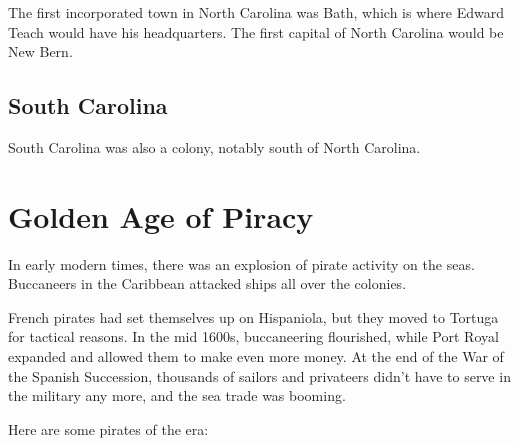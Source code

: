 The first incorporated town in North Carolina was Bath, which is where Edward Teach would have his headquarters.
The first capital of North Carolina would be New Bern.


\subsection*{South Carolina}

South Carolina was also a colony, notably south of North Carolina.

\section{Golden Age of Piracy}

In early modern times, there was an explosion of pirate activity on the seas.
Buccaneers in the Caribbean attacked ships all over the colonies.

French pirates had set themselves up on Hispaniola,
but they moved to Tortuga for tactical reasons.
In the mid 1600s, buccaneering flourished,
while Port Royal expanded and allowed them to make even more money.
At the end of the War of the Spanish Succession,
thousands of sailors and privateers didn't have to serve in the military any more, and the sea trade was booming.

Here are some pirates of the era:

